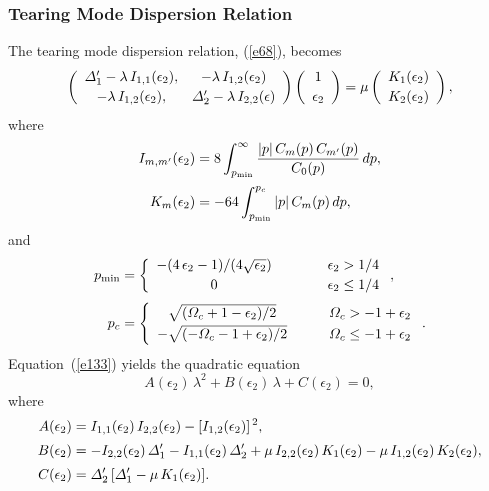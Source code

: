 \documentclass[12pt,prb,aps]{revtex4-1}
\begin{document}
\subsubsection{Tearing Mode Dispersion Relation}
The tearing mode dispersion relation, (\ref{e68}), becomes
\begin{equation}\label{e133}
\left(\begin{array}{cc}
{\mit\Delta}_1'-\lambda\,I_{1,1}(\epsilon_2),&-\lambda\, I_{1,2}(\epsilon_2)\\[0.5ex]
-\lambda\,I_{1,2}(\epsilon_2),&{\mit\Delta}_2'-\lambda\, I_{2,2}(\epsilon)\end{array}\right)\left(\begin{array}{c}1\\[0.5ex]\epsilon_2\end{array}
\right) = \mu\left(\begin{array}{c}K_1(\epsilon_2)\\[0.5ex]K_2(\epsilon_2)\end{array}
\right),
\end{equation}
where 
\begin{align}
I_{m,m'}(\epsilon_2) &= 8\int_{p_{\rm min}}^\infty\frac{|p|\,C_m(p)\,C_{m'}(p)}{C_0(p)}\,dp,\\[0.5ex]
K_m(\epsilon_2)&= -64 \int_{p_{\rm min}}^{p_c} |p|\,C_m(p)\,dp,
\end{align}
and 
\begin{align}
p_{\rm min} &=\left\{
\begin{array}{ccc} - (4\,\epsilon_2-1)/(4\sqrt{\epsilon_2})&~~~~~~& \epsilon_2> 1/4\\[0.5ex]
0&&\epsilon_2\leq 1/4\end{array}
\right.,\\[0.5ex]
p_c &=\left\{
\begin{array}{ccc} \sqrt{({\mit\Omega}_c+1-\epsilon_2)/2}&~~~& {\mit\Omega}_c> -1+\epsilon_2\\[0.5ex]
-\sqrt{(-{\mit\Omega}_c-1+\epsilon_2)/2}&&{\mit\Omega}_c\leq -1+\epsilon_2\end{array}
\right..
\end{align}
Equation~(\ref{e133}) yields the quadratic equation
\begin{equation}\label{e133a}
A(\epsilon_2)\,\lambda^2 + B(\epsilon_2)\,\lambda + C(\epsilon_2) = 0, 
\end{equation}
where
\begin{align}
A(\epsilon_2)& = I_{1,1}(\epsilon_2)\,I_{2,2}(\epsilon_2)-[I_{1,2}(\epsilon_2)]^{\,2},\\[0.5ex]
B(\epsilon_2)&=- I_{2,2}(\epsilon_2)\,{\mit\Delta}_1' - I_{1,1}(\epsilon_2)\,{\mit\Delta}_2' + \mu\,I_{2,2}(\epsilon_2)\,K_1(\epsilon_2) - \mu\,I_{1,2}(\epsilon_2)\,K_2(\epsilon_2),\\[0.5ex]
C(\epsilon_2)&= {\mit\Delta}_2'\,[{\mit\Delta}_1'-\mu\,K_{1}(\epsilon_2)].
\end{align}
\end{document}
